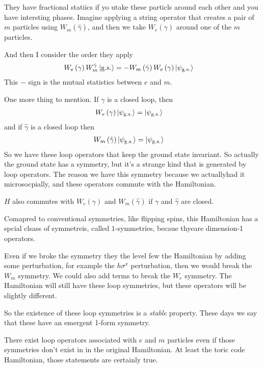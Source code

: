 They have fractional statiics if yo utake these particls around each other and
you have intersting phases.
Imagine applying a string operator that creates a pair of $m$ particles
using $W_m\left( \hat{\gamma} \right)$,
and then we take $W_e\left( \gamma \right)$ around one of the $m$ particles.

And then I consider the order they apply
\begin{align}
    W_e\left( \gamma \right) W_{m}^{\hat{\gamma}}
    \ket{\mathrm{g.s.}}
    &=
    -W_m\left( \hat{\gamma} \right)
    W_e\left( \gamma \right)
    \ket{\psi_{\mathrm{g.s.}}}
\end{align}
This $-$ sign is the mutual statistics between $e$ and $m$.

One more thing to mention.
If $\gamma$ is a closed loop,
then
\begin{align}
    W_e\left( \gamma \right)
    \ket{\psi_{\mathrm{g.s.}}}
    &=
    \ket{\psi_{\mathrm{g.s.}}}
\end{align}
and if $\hat{\gamma}$ is a closed loop then
\begin{align}
    W_m\left( \hat{\gamma} \right)
    \ket{\psi_{\mathrm{g.s.}}}
    &=
    \ket{\psi_{\mathrm{g.s.}}}
\end{align}
So we have these loop operators that keep the ground state invariant.
So actually the ground state has a symmetry,
but it's a strange kind that is generated by loop operators.
The reason we have this symmetry because we actuallyhad it microsocpially,
and these operators commute with the Hamiltonian.

$H$ also commutes with $W_e\left( \gamma \right)$ and $W_{m}\left( \hat{\gamma}
\right)$
if $\gamma$ and $\hat{\gamma}$ are closed.

Comapred to conventional symmetries,
like flipping spins,
this Hamiltonian has a spcial clsass of symmetreis,
called $1$-symmetries,
becaue thyeare dimension-1 operators.

Even if we broke the symmetry they the level few the Hamiltonian by adding some
perturbation,
for example the $h \sigma^x$ perturbation,
then we would break the $W_m$ symmetry.
We could also add terms to break the $W_e$ symmetry.
The Hamiltonian will still have these loop symmetries,
but these operators will be slightly different.

So the existence of these loop symmetries is a \emph{stable} property.
These days we say that these have an emergent 1-form symmetry.

There exist loop operators associated with $e$ and $m$ particles even if those
symmetries don't exist in in the original Hamiltonian.
At least  the toric code Hamiltonian,
those statements are certainly true.

